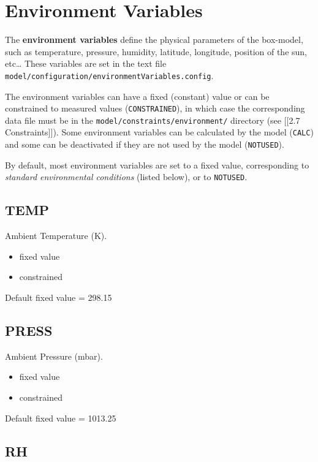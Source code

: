 \section{Environment Variables} \label{sec:environment}

The \textbf{environment variables} define the physical parameters of the
box-model, such as temperature, pressure, humidity, latitude, longitude,
position of the sun, etc\ldots{} These variables are set in the text
file \texttt{model/configuration/environmentVariables.config}.

The environment variables can have a fixed (constant) value or can be
constrained to measured values (\texttt{CONSTRAINED}), in which case the
corresponding data file must be in the
\texttt{model/constraints/environment/} directory (see {[}{[}2.7
Constraints{]}{]}). Some environment variables can be calculated by the
model (\texttt{CALC}) and some can be deactivated if they are not used
by the model (\texttt{NOTUSED}).

By default, most environment variables are set to a fixed value,
corresponding to \emph{standard environmental conditions} (listed
below), or to \texttt{NOTUSED}.

\hypertarget{temp}{%
\subsection{TEMP}\label{temp}}

Ambient Temperature (K).

\begin{itemize}
\item
  fixed value
\item
  constrained
\end{itemize}

Default fixed value = 298.15

\hypertarget{press}{%
\subsection{PRESS}\label{press}}

Ambient Pressure (mbar).

\begin{itemize}
\item
  fixed value
\item
  constrained
\end{itemize}

Default fixed value = 1013.25

\hypertarget{rh}{%
\subsection{RH}\label{rh}}

